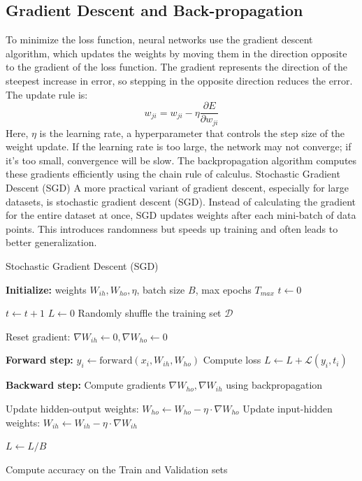 \subsection{Gradient Descent and Back-propagation}
To minimize the loss function, neural networks use the gradient descent algorithm, which updates the weights by moving them in the direction opposite to the gradient of the loss function. The gradient represents the direction of the steepest increase in error, so stepping in the opposite direction reduces the error. The update rule is:
\begin{equation}
    w_{ji} = w_{ji} - \eta \frac{\partial E}{\partial w_{ji}}
\end{equation}
Here, $\eta$ is the learning rate, a hyperparameter that controls the step size of the weight update. If the learning rate is too large, the network may not converge; if it’s too small, convergence will be slow. The backpropagation algorithm computes these gradients efficiently using the chain rule of calculus.
Stochastic Gradient Descent (SGD)
A more practical variant of gradient descent, especially for large datasets, is stochastic gradient descent (SGD). Instead of calculating the gradient for the entire dataset at once, SGD updates weights after each mini-batch of data points. This introduces randomness but speeds up training and often leads to better generalization.

\begin{algorithm}
\caption{Stochastic Gradient Descent (SGD)}
\begin{algorithmic}[1]
\State \textbf{Initialize:} weights $W_{ih}, W_{ho}, \eta$, batch size $B$, max epochs $T_{max}$
\State $t \gets 0$

\Repeat
    \State $t \gets t + 1$
    \State $L \gets 0$ 
    \State Randomly shuffle the training set $\mathcal{D}$

        \State Reset gradient: $\nabla W_{ih} \gets 0, \nabla W_{ho} \gets 0$
        
            \State \textbf{Forward step:} $y_i \gets \text{forward}(x_i, W_{ih}, W_{ho})$
            \State Compute loss $L \gets L + \mathcal{L}(y_i, t_i)$
            
            \State \textbf{Backward step:} Compute gradients $\nabla W_{ho}, \nabla W_{ih}$ using backpropagation
        \EndFor

        \State Update hidden-output weights: $W_{ho} \gets W_{ho} - \eta \cdot \nabla W_{ho}$
        \State Update input-hidden weights: $W_{ih} \gets W_{ih} - \eta \cdot \nabla W_{ih}$
        
        \State $L \gets L / B$ 
    \EndFor
    
    \State Compute accuracy on the Train and Validation sets


\end{algorithmic}
\end{algorithm}

